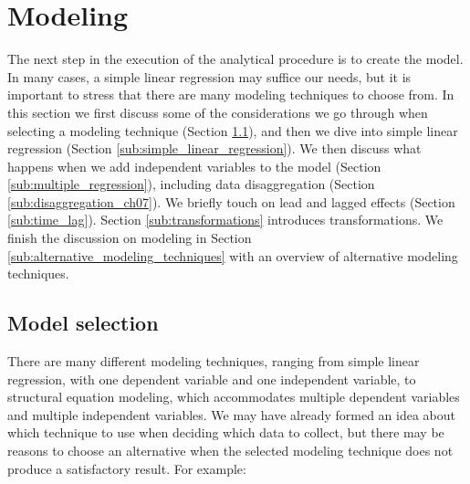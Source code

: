 
\section{Modeling} %
\label{sec:modeling}

The next step in the execution of the analytical procedure is to create the model. In many cases, a simple linear regression may suffice our needs, but it is important to stress that there are many modeling techniques to choose from. In this section we first discuss some of the considerations we go through when selecting a modeling technique (Section \ref{sub:model_selection}), and then we dive into simple linear regression (Section \ref{sub:simple_linear_regression}). We then discuss what happens when we add independent variables to the model (Section \ref{sub:multiple_regression}), including data disaggregation (Section \ref{sub:disaggregation_ch07}). We briefly touch on lead and lagged effects (Section \ref{sub:time_lag}). Section \ref{sub:transformations} introduces transformations. We finish the discussion on modeling in Section \ref{sub:alternative_modeling_techniques} with an overview of alternative modeling techniques.

\subsection{Model selection} %
\label{sub:model_selection}

There are many different modeling techniques, ranging from simple linear regression, with one dependent variable and one independent variable, to structural equation modeling, which accommodates multiple dependent variables and multiple independent variables. We may have already formed an idea about which technique to use when deciding which data to collect, but there may be reasons to choose an alternative when the selected modeling technique does not produce a satisfactory result. For example:

